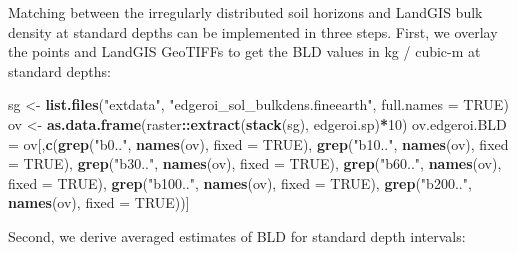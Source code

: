 \documentclass[graybox,natbib,nospthms,UStrade]{svmono}
\newenvironment{Shaded}{\begin{snugshade}}{\end{snugshade}}
\newcommand{\DataTypeTok}[1]{\textcolor[rgb]{0.27,0.27,0.27}{#1}}
\newcommand{\DecValTok}[1]{\textcolor[rgb]{0.06,0.06,0.06}{#1}}
\newcommand{\KeywordTok}[1]{\textcolor[rgb]{0.27,0.27,0.27}{\textbf{#1}}}
\newcommand{\NormalTok}[1]{#1}
\newcommand{\OperatorTok}[1]{\textcolor[rgb]{0.43,0.43,0.43}{\textbf{#1}}}
\newcommand{\OtherTok}[1]{\textcolor[rgb]{0.37,0.37,0.37}{#1}}
\newcommand{\StringTok}[1]{\textcolor[rgb]{0.5,0.5,0.5}{#1}}
\begin{document}
Matching between the irregularly distributed soil horizons and LandGIS bulk density at standard depths can be implemented in three steps. First, we overlay the points and LandGIS GeoTIFFs to get the BLD values in kg / cubic-m at standard depths:

\begin{Shaded}
\begin{Highlighting}[]
\NormalTok{sg <-}\StringTok{ }\KeywordTok{list.files}\NormalTok{(}\StringTok{"extdata"}\NormalTok{, }\StringTok{"edgeroi_sol_bulkdens.fineearth"}\NormalTok{, }\DataTypeTok{full.names =} \OtherTok{TRUE}\NormalTok{)}
\NormalTok{ov <-}\StringTok{ }\KeywordTok{as.data.frame}\NormalTok{(raster}\OperatorTok{::}\KeywordTok{extract}\NormalTok{(}\KeywordTok{stack}\NormalTok{(sg), edgeroi.sp)}\OperatorTok{*}\DecValTok{10}\NormalTok{)}
\NormalTok{ov.edgeroi.BLD =}\StringTok{ }\NormalTok{ov[,}\KeywordTok{c}\NormalTok{(}\KeywordTok{grep}\NormalTok{(}\StringTok{"b0.."}\NormalTok{, }\KeywordTok{names}\NormalTok{(ov),}
                            \DataTypeTok{fixed =} \OtherTok{TRUE}\NormalTok{), }\KeywordTok{grep}\NormalTok{(}\StringTok{"b10.."}\NormalTok{, }\KeywordTok{names}\NormalTok{(ov), }\DataTypeTok{fixed =} \OtherTok{TRUE}\NormalTok{), }
                       \KeywordTok{grep}\NormalTok{(}\StringTok{"b30.."}\NormalTok{, }\KeywordTok{names}\NormalTok{(ov), }
                            \DataTypeTok{fixed =} \OtherTok{TRUE}\NormalTok{), }\KeywordTok{grep}\NormalTok{(}\StringTok{"b60.."}\NormalTok{, }\KeywordTok{names}\NormalTok{(ov), }\DataTypeTok{fixed =} \OtherTok{TRUE}\NormalTok{), }
                       \KeywordTok{grep}\NormalTok{(}\StringTok{"b100.."}\NormalTok{, }\KeywordTok{names}\NormalTok{(ov), }
                            \DataTypeTok{fixed =} \OtherTok{TRUE}\NormalTok{), }\KeywordTok{grep}\NormalTok{(}\StringTok{"b200.."}\NormalTok{, }\KeywordTok{names}\NormalTok{(ov), }\DataTypeTok{fixed =} \OtherTok{TRUE}\NormalTok{))]}
\end{Highlighting}
\end{Shaded}

Second, we derive averaged estimates of BLD for standard depth intervals:
\end{document}
